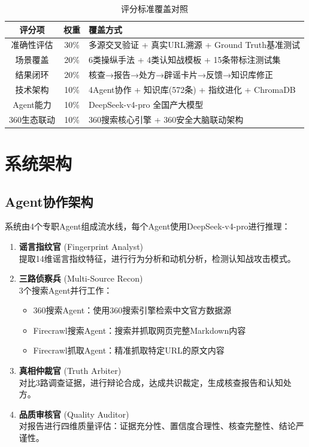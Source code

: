 \documentclass[12pt,a4paper]{ctexart}
\begin{document}
\begin{table}[h]
\centering
\begin{tabular}{|c|c|l|}
\hline
\textbf{评分项} & \textbf{权重} & \textbf{覆盖方式} \\
\hline
准确性评估 & 30\% & 多源交叉验证 + 真实URL溯源 + Ground Truth基准测试 \\
场景覆盖 & 20\% & 6类操纵手法 + 4类认知战模板 + 15条带标注测试集 \\
结果闭环 & 20\% & 核查→报告→处方→辟谣卡片→反馈→知识库修正 \\
技术架构 & 10\% & 4Agent协作 + 知识库(572条) + 指纹进化 + ChromaDB \\
Agent能力 & 10\% & DeepSeek-v4-pro 全国产大模型 \\
360生态联动 & 10\% & 360搜索核心引擎 + 360安全大脑联动架构 \\
\hline
\end{tabular}
\caption{评分标准覆盖对照}
\end{table}

\section{系统架构}

\subsection{Agent协作架构}

系统由4个专职Agent组成流水线，每个Agent使用DeepSeek-v4-pro进行推理：

\begin{enumerate}[leftmargin=*]
    \item \textbf{谣言指纹官} (Fingerprint Analyst)\\
    提取14维谣言指纹特征，进行行为分析和动机分析，检测认知战攻击模式。

    \item \textbf{三路侦察兵} (Multi-Source Recon)\\
    3个搜索Agent并行工作：
    \begin{itemize}
        \item 360搜索Agent：使用360搜索引擎检索中文官方数据源
        \item Firecrawl搜索Agent：搜索并抓取网页完整Markdown内容
        \item Firecrawl抓取Agent：精准抓取特定URL的原文内容
    \end{itemize}

    \item \textbf{真相仲裁官} (Truth Arbiter)\\
    对比3路调查证据，进行辩论合成，达成共识裁定，生成核查报告和认知处方。

    \item \textbf{品质审核官} (Quality Auditor)\\
    对报告进行四维质量评估：证据充分性、置信度合理性、核查完整性、结论严谨性。
\end{enumerate}
\end{document}
